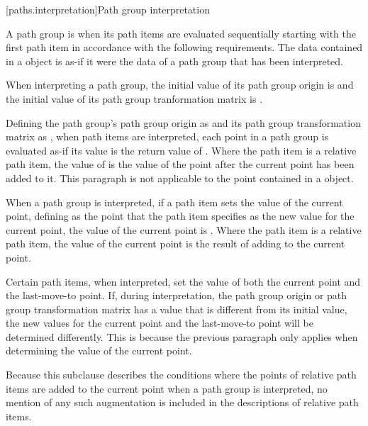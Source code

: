 
 [paths.interpretation]{Path group interpretation}

\pnum
A path group is  when its path items are evaluated sequentially starting with the first path item in accordance with the following requirements. The data contained in a  object is as-if it were the data of a path group that has been interpreted.

\pnum
When interpreting a path group, the initial value of its path group origin is  and the initial value of its path group tranformation matrix is .

\pnum
Defining the path group's path group origin as  and its path group transformation matrix as , when path items are interpreted, each point  in a path group is evaluated as-if its value is the return value of . Where the path item is a relative path item, the value of  is the value of the point after the current point has been added to it. This paragraph is not applicable to the point contained in a  object.

\pnum
When a path group is interpreted, if a path item sets the value of the current point, defining  as the point that the path item specifies as the new value for the current point, the value of the current point is . Where the path item is a relative path item, the value of the current point is the result of adding  to the current point.

\pnum
\begin{note}
Certain path items, when interpreted, set the value of both the current point and the last-move-to point. If, during interpretation, the path group origin or path group transformation matrix has a value that is different from its initial value, the new values for the current point and the last-move-to point will be determined differently. This is because the previous paragraph only applies when determining the value of the current point.
\end{note}

\pnum
\begin{note}
Because this subclause describes the conditions where the points of relative path items are added to the current point when a path group is interpreted, no mention of any such augmentation is included in the descriptions of relative path items.
\end{note}

